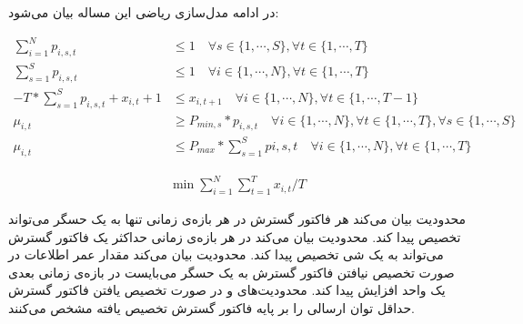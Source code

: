 

در ادامه مدل‌سازی ریاضی این مساله بیان می‌شود:

\begin{align}
  \sum_{i = 1}^{N} p_{i, s, t} &\le 1 \quad \forall s \in \{1, \cdots, S\}, \forall t \in \{1, \cdots, T\} \label{eq:constr_subchannel_limit} \\
  \sum_{s = 1}^{S} p_{i, s, t} &\le 1 \quad \forall i \in \{1, \cdots, N\}, \forall t \in \{1, \cdots, T\} \label{eq:constr_thing_limit} \\
  -T * \sum_{s = 1}^{S} p_{i, s, t} + x_{i, t} + 1 &\le x_{i, t + 1} \quad \forall i \in \{1, \cdots, N\}, \forall t \in \{1, \cdots, T - 1\} \label{eq:constr_aoi_limit} \\
  \mu_{i,t} &\ge P_{min, s} * p_{i, s, t} \quad \forall i \in \{1, \cdots, N\}, \forall t \in \{1, \cdots, T\}, \forall s \in \{1, \cdots, S\} \label{eq:power_range_1} \\
  \mu_{i, t} &\le P_{max} * \sum_{s = 1}^{S} p{i, s, t} \quad \forall i \in \{1, \cdots, N\}, \forall t \in \{1, \cdots, T\} \label{eq:power_range_2}
\end{align}

\begin{align}
  \min \sum_{i = 1}^{N} \sum_{t = 1}^{T} x_{i, t} / T
\end{align}


محدودیت  بیان می‌کند هر فاکتور گسترش در هر بازه‌ی زمانی تنها به یک حسگر می‌تواند تخصیص پیدا کند.
محدودیت  بیان می‌کند در هر بازه‌ی زمانی حداکثر یک فاکتور گسترش می‌تواند به یک شی تخصیص پیدا کند.
محدودیت  بیان می‌کند مقدار عمر اطلاعات در صورت تخصیص نیافتن فاکتور گسترش به یک حسگر می‌بایست در بازه‌ی زمانی بعدی یک واحد افزایش پیدا کند.
محدودیت‌های  و  در صورت تخصیص یافتن فاکتور گسترش حداقل توان ارسالی را بر پایه فاکتور گسترش تخصیص یافته مشخص می‌کنند.
